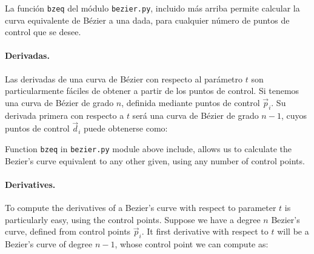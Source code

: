 \begin{paracol}{2}
La función \texttt{bzeq} del módulo \texttt{bezier.py}, incluido más arriba  permite calcular la curva equivalente de Bézier a una dada, para cualquier número de puntos de control que se desee. 
\paragraph{Derivadas.} Las derivadas de una curva de Bézier con respecto al parámetro $t$ son particularmente fáciles de obtener a partir de los puntos de control. Si tenemos una curva de Bézier de grado $n$, definida mediante puntos de control $\vec{p}_i$. Su derivada primera con respecto a $t$ será una curva de Bézier de grado $n-1$, cuyos puntos de control $\vec{d}_i$  puede obtenerse como:

\switchcolumn
Function \texttt{bzeq} in \texttt{bezier.py} module above include, allows us to calculate the Bezier's curve equivalent to any other given, using any number of control points. 



\paragraph{Derivatives.} To compute the derivatives of a Bezier's curve  with respect to parameter $t$ is particularly easy, using the control points. Suppose we have a degree $n$ Bezier's curve, defined from control points $\vec{p}_i$. It first derivative with respect to $t$ will be a Bezier's curve of degree $n-1$, whose control point we can compute as: 
\end{paracol}

